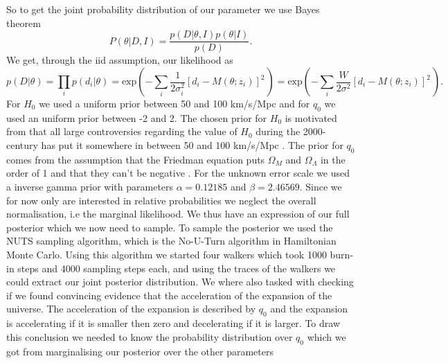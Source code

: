 \documentclass[11pt,a4paper]{article}
\begin{document}
\\\\
So to get the joint probability distribution of our parameter we use Bayes theorem 
\begin{equation*}
    P(\theta| D, I) =  \frac{p(D|\theta, I)p(\theta|I)}{p(D)}.
\end{equation*}
We get, through the iid assumption, our likelihood as
\begin{equation*}
    p(D|\theta) =  \prod_i p(d_i|\theta) = \text{exp}\left(-\sum_i \frac{1}{2\sigma_i^2}\left[d_i - M(\theta;z_i)\right]^2\frac{}{}\right) =  \text{exp}\left(-\sum_i \frac{W}{2\sigma^2}\left[d_i - M(\theta;z_i)\right]^2\frac{}{}\right).
\end{equation*}
For $H_0$ we used a uniform prior between 50 and 100 km/s/Mpc and for $q_0$ we used an uniform prior between -2 and 2. The chosen prior for $H_0$ is motivated from that all large controversies regarding the value of $H_0$ during the 2000-century has put it somewhere in between 50 and 100 km/s/Mpc \cite{}. The prior for $q_0$ comes from the assumption that the Friedman equation puts $\Omega_M$ and $\Omega_\Lambda$ in the order of 1 and that they can't be negative \cite{}. For the unknown error scale we used a inverse gamma prior with parameters $\alpha = 0.12185$ and $\beta = 2.46569$. Since we for now only are interested in relative probabilities we neglect the overall normalisation, i.e the marginal likelihood. We thus have an expression of our full posterior which we now need to sample. To sample the posterior we used the NUTS sampling algorithm, which is the No-U-Turn algorithm in Hamiltonian Monte Carlo. Using this algorithm we started four walkers which took 1000 burn-in steps and 4000 sampling steps each, and using the traces of the walkers we could extract our joint posterior distribution. We where also tasked with checking if we found convincing evidence that the acceleration of the expansion of the universe. The acceleration of the expansion is described by $q_0$ and the expansion is accelerating if it is smaller then zero and decelerating if it is larger. To draw this conclusion we needed to know the probability distribution over $q_0$ which we got from marginalising our posterior over the other parameters
\end{document}
